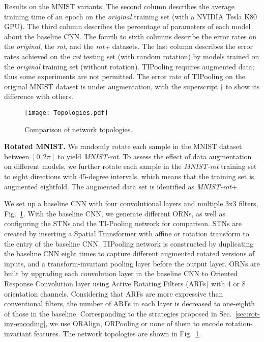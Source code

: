 \documentclass[10pt,twocolumn,letterpaper]{article}
\begin{document}
\begin{table*}[t!]
\begin{center}
        \end{center}
        \caption{
            Results on the MNIST variants. The second column describes the average training time of an epoch on the \textit{original} training set (with a NVIDIA Tesla K80 GPU).
            The third column describes the percentage of parameters of each model about the baseline CNN. The fourth to sixth columns describe the error rates on the \textit{original}, the \textit{rot}, and the \textit{rot+} datasets. The last column describes the error rates achieved on the \textit{rot} testing set (with random rotation) by models trained on the \textit{original} training set (without rotation). TIPooling requires augmented data; thus some experiments are not permitted. The error rate of TIPooling on the original MNIST dataset is under augmentation, with the superscript $\dagger$ to show its difference with others.
        }
    \label{tab:MNIST-rot}
    \vspace{-0.4em}
    \end{table*}

    \begin{figure}[t]
        \begin{center}
            \texttt{[image: Topologies.pdf]}
        \end{center}
        \caption{Comparison of network topologies.}
    \label{fig:Topologies}
    \vspace{-1em}
    \end{figure}

    \textbf{Rotated MNIST.}
    We randomly rotate each sample in the MNIST dataset \cite{Liu2003} between $[0, 2\pi]$ to yield \textit{MNIST-rot}. To assess the effect of data augmentation on different models, we further rotate each sample in the \textit{MNIST-rot} training set to eight directions with 45-degree intervals, which means that the training set is augmented eightfold. The augmented data set is identified as \textit{MNIST-rot}+.

    We set up a baseline CNN with four convolutional layers and multiple 3x3 filters, Fig.~\ref{fig:Topologies}.
    With the baseline CNN, we generate different ORNs, as well as configuring the STNs \cite{Jaderberg2015} and the TI-Pooling network \cite{Laptev2016} for comparison.
    STNs are created by inserting a Spatial Transformer with affine or rotation transform to the entry of the baseline CNN.
    TIPooling network is constructed by duplicating the baseline CNN eight times to capture different augmented rotated versions of inputs, and a transform-invariant pooling layer before the output layer. ORNs are built by upgrading each convolution layer in the baseline CNN to Oriented Response Convolution layer using Active Rotating Filters (ARFs) with 4 or 8 orientation channels. Considering that ARFs are more expressive than conventional filters, the number of ARFs in each layer is decreased to one-eighth of those in the baseline. Corresponding to the strategies proposed in Sec.~\ref{sec:rot-inv-encoding}, we use ORAlign, ORPooling or none of them to encode rotation-invariant features. The network topologies are shown in Fig.~\ref{fig:Topologies}.
\end{document}
